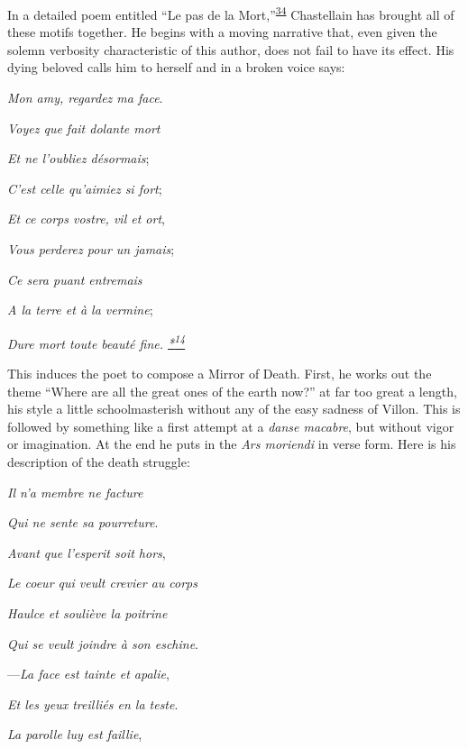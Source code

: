 In a detailed poem entitled ``Le pas de la
Mort,''\textsuperscript{\protect\hypertarget{12_Chapter_Five__THE_VISION_OF_DEAT.xhtmlux5cux23id_1284}{\protect\hyperlink{23_NOTES.xhtmlux5cux23id_1285}{34}}}
Chastellain
\protect\hypertarget{12_Chapter_Five__THE_VISION_OF_DEAT.xhtmlux5cux23page_168}{}{}has
brought all of these motifs together. He begins with a moving narrative
that, even given the solemn verbosity characteristic of this author,
does not fail to have its effect. His dying beloved calls him to herself
and in a broken voice says:

\emph{Mon amy, regardez ma face}.

\emph{Voyez que fait dolante mort}

\emph{Et ne l'oubliez désormais};

\emph{C'est celle qu'aimiez si fort};

\emph{Et ce corps vostre, vil et ort},

\emph{Vous perderez pour un jamais};

\emph{Ce sera puant entremais}

\emph{A la terre et à la vermine};

\emph{Dure mort toute beauté fine.
\protect\hypertarget{12_Chapter_Five__THE_VISION_OF_DEAT.xhtmlux5cux23id_2977}{\protect\hyperlink{23_NOTES.xhtmlux5cux23id_2978}{*\textsuperscript{14}}}}

This induces the poet to compose a Mirror of Death. First, he works out
the theme ``Where are all the great ones of the earth now?'' at far too
great a length, his style a little schoolmasterish without any of the
easy sadness of Villon. This is followed by something like a first
attempt at a \emph{danse macabre}, but without vigor or imagination. At
the end he puts in the \emph{Ars moriendi} in verse form. Here is his
description of the death struggle:

\emph{Il n'a membre ne facture}

\emph{Qui ne sente sa pourreture}.

\emph{Avant que l'esperit soit hors},

\emph{Le coeur qui veult crevier au corps}

\emph{Haulce et souliève la poitrine}

\emph{Qui se veult joindre à son eschine}.

---\emph{La face est tainte et apalie},

\emph{Et les yeux treilliés en la teste}.

\emph{La parolle luy est faillie},

